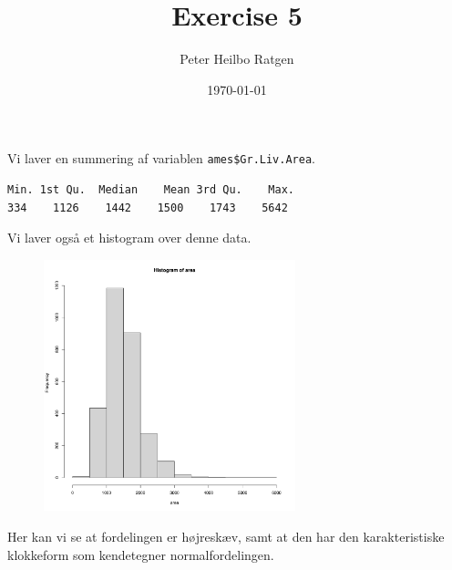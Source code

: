 \documentclass{article}
\title{Exercise 5}
\author{Peter Heilbo Ratgen}
\date{\today}
\begin{document}
\maketitle
Vi laver en summering af variablen \texttt{ames\$Gr.Liv.Area}. 
\begin{lstlisting}
Min. 1st Qu.  Median    Mean 3rd Qu.    Max.
334    1126    1442    1500    1743    5642
\end{lstlisting}
Vi laver også et histogram over denne data.
\begin{figure}[H]
  \centering
  \includegraphics[width=0.65\textwidth]{../area_hist.pdf}
\end{figure}
Her kan vi se at fordelingen er højreskæv, samt at den har den karakteristiske
klokkeform som kendetegner normalfordelingen. 
\end{document}
